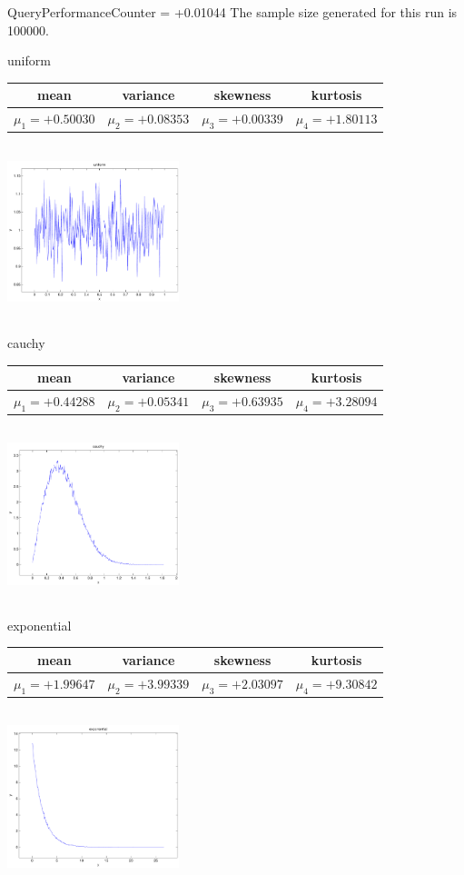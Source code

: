 \documentclass[9pt]{article}
\theoremstyle{plain}
\theoremstyle{definition}
\theoremstyle{remark}
\numberwithin{equation}{section}
\begin{document}
QueryPerformanceCounter  =  +0.01044
The sample size generated for this run is 100000.

\newpage
uniform \begin{tabular}{|c|c|c|c|}  mean & variance & skewness & kurtosis \\  \hline
$\mu_1 = +0.50030$ & $\mu_2 = +0.08353$ & $\mu_3 = +0.00339$ & $\mu_4 =+1.80113$ \\
\end{tabular}

\includegraphics[width=5cm,height=5cm]{uniform.pdf}

cauchy \begin{tabular}{|c|c|c|c|}  mean & variance & skewness & kurtosis \\  \hline
$\mu_1 = +0.44288$ & $\mu_2 = +0.05341$ & $\mu_3 = +0.63935$ & $\mu_4 =+3.28094$ \\
\end{tabular}

\includegraphics[width=5cm,height=5cm]{cauchy.pdf}

exponential \begin{tabular}{|c|c|c|c|}  mean & variance & skewness & kurtosis \\  \hline
$\mu_1 = +1.99647$ & $\mu_2 = +3.99339$ & $\mu_3 = +2.03097$ & $\mu_4 =+9.30842$ \\
\end{tabular}

\includegraphics[width=5cm,height=5cm]{exponential.pdf}
\end{document}
